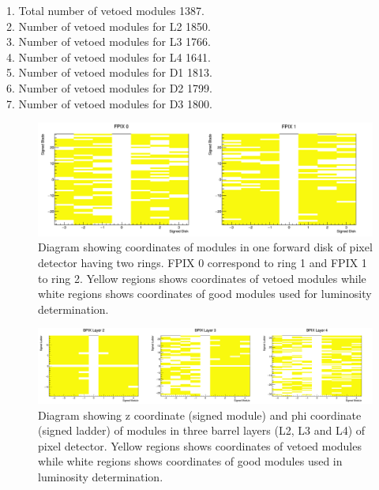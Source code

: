 \begin{flushleft}
1. Total number of vetoed modules 1387. \\
2. Number of vetoed modules for L2 1850.\\
3. Number of vetoed modules for L3 1766.\\
4. Number of vetoed modules for L4 1641.\\
5. Number of vetoed modules for D1 1813.\\
6. Number of vetoed modules for D2  1799.\\
7. Number of vetoed modules for D3 1800.\\
\end{flushleft}


\begin{figure}[H]
  \centering
  \includegraphics[width=0.8 \columnwidth]{./PDDisk_R12.png}
  \caption{ \onehalfspacing Diagram showing coordinates of modules in one forward disk of pixel detector having two rings. FPIX 0 correspond to ring 1 and FPIX 1 to ring 2. Yellow regions shows coordinates of vetoed modules while white regions shows coordinates of good modules used for luminosity determination.}
  \label{fig:CMS}
\end{figure}

\begin{figure}[H]
  \centering
  \includegraphics[width=1 \columnwidth]{./bpixL2-L4.png}
  \caption{ \onehalfspacing Diagram showing z coordinate (signed module) and phi coordinate (signed ladder) of modules in three barrel layers (L2, L3 and L4) of pixel detector. Yellow regions shows coordinates of vetoed modules while white regions shows coordinates of good modules used in luminosity determination. }
  \label{fig:CMS}
\end{figure}






